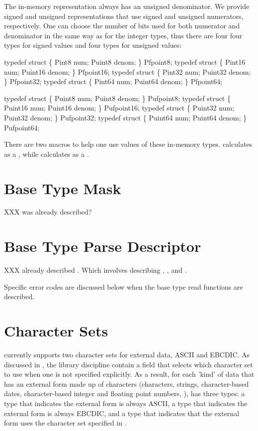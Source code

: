 The in-memory representation always has an unsigned denominator. We
provide signed and unsigned representations that use signed and
unsigned numerators, respectively.  One can choose the number of bits
used for both numerator and denominator in the same way as for the
integer types, thus there are four four types for signed values
and four types for unsigned values:

\begin{tinycodeaux}{\leftmargin=0in}
typedef struct \{ Pint8   num; Puint8  denom; \} Pfpoint8;
typedef struct \{ Pint16  num; Puint16 denom; \} Pfpoint16;
typedef struct \{ Pint32  num; Puint32 denom; \} Pfpoint32;
typedef struct \{ Pint64  num; Puint64 denom; \} Pfpoint64;

typedef struct \{ Puint8  num; Puint8  denom; \} Pufpoint8;
typedef struct \{ Puint16 num; Puint16 denom; \} Pufpoint16;
typedef struct \{ Puint32 num; Puint32 denom; \} Pufpoint32;
typedef struct \{ Puint64 num; Puint64 denom; \} Pufpoint64;
\end{tinycodeaux}

There are two macros to help one use values of these in-memory types.
 calculates  as a ,
while  calculates  as a .

\section{Base Type Mask}
\label{sec:base-type-mask}

XXX \Pbasem{} was already described?

\section{Base Type Parse Descriptor}
\label{sec:base-type-parse-descriptors}

XXX already described \Pbasepd{}.  Which involves describing \Ploct{}, \Ppost{},
and \PerrCodet{}.  

Specific error codes are discussed below
when the base type read functions are described.

\section{Character Sets}

\PADSL{} currently supports two character sets for external data, ASCII and EBCDIC.
As discussed in , the library
discipline contain a field
 that selects which character set to use when
one is not specified explicitly.  As a result, for each 'kind' of data
that has an external form made up of characters (characters, strings,
character-based dates, character-based integer and floating point
numbers, \etc{}), \PADSL{} has three types: a type that indicates the external
form is always ASCII, a type that indicates the external form is
always EBCDIC, and a type that indicates that the external form uses
the character set specified in .

